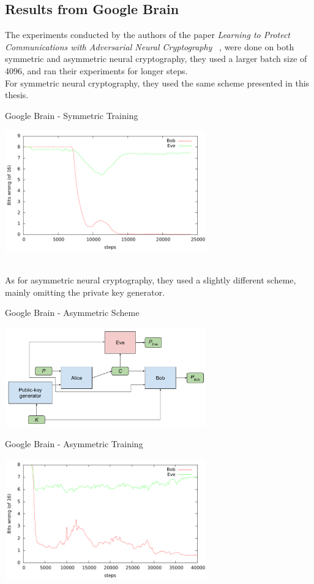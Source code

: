 \documentclass[a4paper, 12pt]{report}
\begin{document}
\subsection{\textbf{Results from Google Brain} ~\citep{DBLP:journals/corr/AbadiA16}}
The experiments conducted by the authors of the paper \textit{Learning to Protect Communications with Adversarial Neural Cryptography} ~\citep{DBLP:journals/corr/AbadiA16}, were done on both symmetric and asymmetric neural cryptography, they used a larger batch size of 4096, and ran their experiments for longer steps.\\
For symmetric neural cryptography, they used the same scheme presented in this thesis.
\begin{blockfigure}{Google Brain - Symmetric Training}
	\begin{center}
		\includegraphics[width = 0.65\textwidth]{cryptolearn_batch_tighter}
	\end{center}
\end{blockfigure}\\
As for asymmetric neural cryptography, they used a slightly different scheme, mainly omitting the private key generator.
\begin{blockfigure}{Google Brain - Asymmetric Scheme}
	\begin{center}
		\includegraphics[width = 0.65\textwidth]{asymm}
	\end{center}
\end{blockfigure}
\begin{blockfigure}{Google Brain - Asymmetric Training}
	\begin{center}
		\includegraphics[width = 0.65\textwidth]{pubkey_bob_v_eve}
	\end{center}
\end{blockfigure}
\newpage
\end{document}
